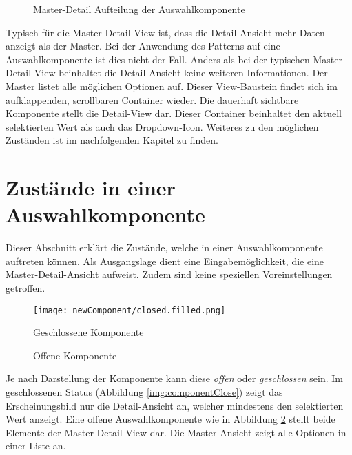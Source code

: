 \begin{figure}[!htb] %
    \centering
    \caption{\centering \color{red} Master-Detail Aufteilung der Auswahlkomponente}
    \label{img:masterDetailView}
\end{figure}

Typisch für die Master-Detail-View ist, dass die Detail-Ansicht mehr Daten anzeigt als der Master. 
Bei der Anwendung des Patterns auf eine Auswahlkomponente ist dies nicht der Fall. 
Anders als bei der typischen Master-Detail-View beinhaltet die Detail-Ansicht keine weiteren Informationen. 
Der Master listet alle möglichen Optionen auf. 
Dieser View-Baustein findet sich im aufklappenden, scrollbaren Container wieder. 
Die dauerhaft sichtbare Komponente stellt die Detail-View dar. 
Dieser Container beinhaltet den aktuell selektierten Wert als auch das Dropdown-Icon. 
Weiteres zu den möglichen Zuständen ist im nachfolgenden Kapitel zu finden. 


\section{Zustände in einer Auswahlkomponente}
\label{sec:states}

Dieser Abschnitt erklärt die Zustände, welche in einer Auswahlkomponente auftreten können. 
Als Ausgangslage dient eine Eingabemöglichkeit, die eine Master-Detail-Ansicht aufweist. 
Zudem sind keine speziellen Voreinstellungen getroffen. 

\begin{figure}[!htb] %
    \centering
    \begin{minipage}[b]{0.45\textwidth}
        \centering
        \texttt{[image: newComponent/closed.filled.png]}
        \caption{Geschlossene Komponente}
        \label{img:componentClose}
    \end{minipage}
    \hfill
    \begin{minipage}[b]{0.45\textwidth}
        \centering
        \caption{\centering \color{red} Offene Komponente}
        \label{img:componentOpen}
    \end{minipage}
\end{figure}

Je nach Darstellung der Komponente kann diese \emph{offen} oder \emph{geschlossen} sein. 
Im geschlossenen Status (Abbildung \ref{img:componentClose}) zeigt das Erscheinungsbild nur die Detail-Ansicht an, welcher mindestens den selektierten Wert anzeigt. 
Eine offene Auswahlkomponente wie in Abbildung \ref{img:componentOpen} stellt beide Elemente der Master-Detail-View dar. 
Die Master-Ansicht zeigt alle Optionen in einer Liste an. 

